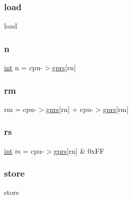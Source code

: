 \subsubsection{\texorpdfstring{load}{load}}
{\footnotesize\ttfamily load}

\mbox{\label{isa-thumb_8c_a76f11d9a0a47b94f72c2d0e77fb32240}} 
\subsubsection{\texorpdfstring{n}{n}}
{\footnotesize\ttfamily \mbox{\hyperlink{ioapi_8h_a787fa3cf048117ba7123753c1e74fcd6}{int}} n = cpu-\/$>$\mbox{\hyperlink{isa-thumb_8c_a6b4b7e13a9a144391615b217c5917bc7}{gprs}}\mbox{[}rn\mbox{]}}

\mbox{\label{isa-thumb_8c_a20e40d2fb8c51fa4dd2b4449ad32e111}} 
\subsubsection{\texorpdfstring{rm}{rm}}
{\footnotesize\ttfamily rm = cpu-\/$>$\mbox{\hyperlink{isa-thumb_8c_a6b4b7e13a9a144391615b217c5917bc7}{gprs}}\mbox{[}rn\mbox{]} + cpu-\/$>$\mbox{\hyperlink{isa-thumb_8c_a6b4b7e13a9a144391615b217c5917bc7}{gprs}}\mbox{[}rm\mbox{]}}

\mbox{\label{isa-thumb_8c_a03b78d51ad860bbea2f9c98276d0b70b}} 
\subsubsection{\texorpdfstring{rs}{rs}}
{\footnotesize\ttfamily \mbox{\hyperlink{ioapi_8h_a787fa3cf048117ba7123753c1e74fcd6}{int}} rs = cpu-\/$>$\mbox{\hyperlink{isa-thumb_8c_a6b4b7e13a9a144391615b217c5917bc7}{gprs}}\mbox{[}rn\mbox{]} \& 0x\+FF}

\mbox{\label{isa-thumb_8c_aa7072e7bfc5f1cdeadec25ecc3c246bf}} 
\subsubsection{\texorpdfstring{store}{store}}
{\footnotesize\ttfamily store}

